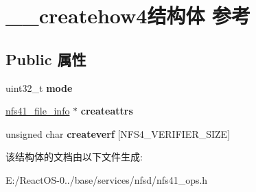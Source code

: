 \hypertarget{struct____createhow4}{}\section{\+\_\+\+\_\+createhow4结构体 参考}
\label{struct____createhow4}
\subsection*{Public 属性}
\begin{DoxyCompactItemize}
\item 
\mbox{\label{struct____createhow4_ae63a71c696bb0e593749f5db0d31fc25}} 
uint32\+\_\+t {\bfseries mode}
\item 
\mbox{\label{struct____createhow4_a3f0754c3083db651e632bb59c24330ca}} 
\hyperlink{struct____nfs41__file__info}{nfs41\+\_\+file\+\_\+info} $\ast$ {\bfseries createattrs}
\item 
\mbox{\label{struct____createhow4_a2c830024a6607785902961e6d21adb64}} 
unsigned char {\bfseries createverf} \mbox{[}N\+F\+S4\+\_\+\+V\+E\+R\+I\+F\+I\+E\+R\+\_\+\+S\+I\+ZE\mbox{]}
\end{DoxyCompactItemize}


该结构体的文档由以下文件生成\+:\begin{DoxyCompactItemize}
\item 
E\+:/\+React\+O\+S-\/0../base/services/nfsd/nfs41\+\_\+ops.\+h\end{DoxyCompactItemize}
